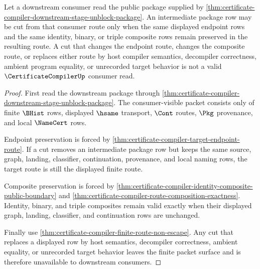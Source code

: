 \begin{theorem}
\label{thm:certificate-compiler-ledger-cut-elimination}
Let a downstream consumer read the public package supplied by
\autoref{thm:certificate-compiler-downstream-stage-unblock-package}. An
intermediate package row may be cut from that consumer route only when the
same displayed endpoint rows and the same identity, binary, or triple
composite rows remain preserved in the resulting route. A cut that changes
the endpoint route, changes the composite route, or replaces either route by
host compiler semantics, decompiler correctness, ambient program equality, or
unrecorded target behavior is not a valid $\CertificateCompilerUp$ consumer
read.
\end{theorem}
\begin{proof}
First read the downstream package through
\autoref{thm:certificate-compiler-downstream-stage-unblock-package}. The
consumer-visible packet consists only of finite $\BHist$ rows, displayed
$\hsame$ transport, $\Cont$ routes, $\Pkg$ provenance, and local $\NameCert$
rows.

Endpoint preservation is forced by
\autoref{thm:certificate-compiler-target-endpoint-route}. If a cut removes an
intermediate package row but keeps the same source, graph, landing,
classifier, continuation, provenance, and local naming rows, the target route
is still the displayed finite route.

Composite preservation is forced by
\autoref{thm:certificate-compiler-identity-composite-public-boundary} and
\autoref{thm:certificate-compiler-route-composition-exactness}. Identity,
binary, and triple composites remain valid exactly when their displayed graph,
landing, classifier, and continuation rows are unchanged.

Finally use \autoref{thm:certificate-compiler-finite-route-non-escape}. Any
cut that replaces a displayed row by host semantics, decompiler correctness,
ambient equality, or unrecorded target behavior leaves the finite packet
surface and is therefore unavailable to downstream consumers.
\end{proof}

